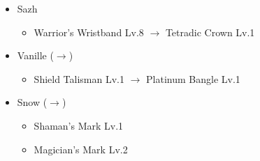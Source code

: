 \begin{menu}
\begin{itemize}
		\equip
		\begin{itemize}
			\item Sazh
				\begin{itemize}
					\item Warrior's Wristband Lv.8 $\rightarrow$ Tetradic Crown Lv.1
				\end{itemize}
			\item Vanille ($\rightarrow$)
			    \begin{itemize}
					\item Shield Talisman Lv.1 $\rightarrow$ Platinum Bangle Lv.1
			    \end{itemize}
			\item Snow ($\rightarrow$)
			    \begin{itemize}
				    \item Shaman's Mark Lv.1
				    \item Magician's Mark Lv.2
			    \end{itemize}
		\end{itemize}
	\end{itemize}
\end{menu}

\renewcommand{\first}{[1] Hero's Charge (\syn/\med/\com)}
\renewcommand{\second}{[2] Tri-Disaster (\rav/\rav/\rav)}
\renewcommand{\third}{[3] Thaumaturgy (\rav/\med/\rav)}
\renewcommand{\fourth}{[4] Smart Bomb (\rav/\sab/\rav)}
\renewcommand{\fifth}{[5] Aggression (\com/\rav/\com)}
\renewcommand{\sixth}{[6] Mystic Tower (\rav/\rav/\sen)}

